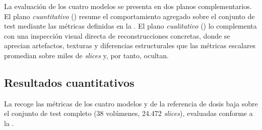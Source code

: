 La evaluación de los cuatro modelos se presenta en dos planos
complementarios. El plano \emph{cuantitativo}
() resume el comportamiento agregado
sobre el conjunto de test mediante las métricas definidas en la
. El plano \emph{cualitativo}
() lo complementa con una inspección
visual directa de reconstrucciones concretas, donde se aprecian
artefactos, texturas y diferencias estructurales que las métricas
escalares promedian sobre miles de \textit{slices} y, por tanto,
ocultan.

\subsection{Resultados cuantitativos}
\label{sec:pet-resultados-cuant}

La  recoge las métricas de los cuatro
modelos y de la referencia de dosis baja sobre el conjunto de test
completo (38 volúmenes, 24.472 \textit{slices}), evaluadas conforme
a la .


